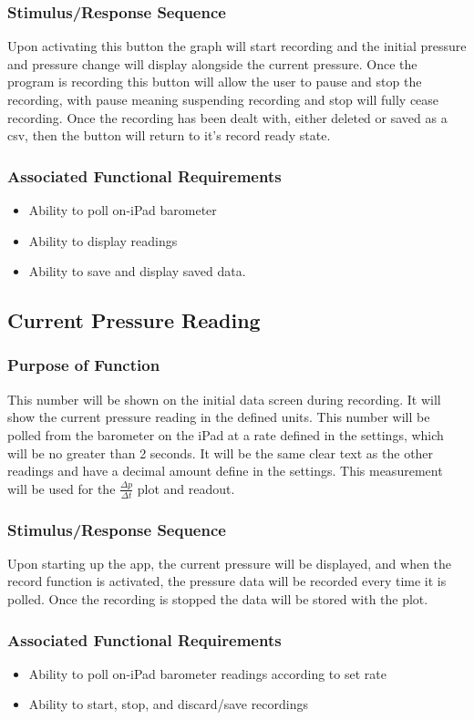 \documentclass[onecolumn, draftclsnofoot,10pt, compsoc]{IEEEtran}
\begin{document}
\subsubsection{Stimulus/Response Sequence}
Upon activating this button the graph will start recording and the initial pressure and pressure change will display alongside the current pressure.
Once the program is recording this button will allow the user to pause and stop the recording, with pause meaning suspending recording and stop will fully cease recording.
Once the recording has been dealt with, either deleted or saved as a csv, then the button will return to it's record ready state.
\subsubsection{Associated Functional Requirements}
\begin{itemize}
\item Ability to poll on-iPad barometer
\item Ability to display readings
\item Ability to save and display saved data.
\end{itemize}

\subsection{Current Pressure Reading}
\subsubsection{Purpose of Function}
This number will be shown on the initial data screen during recording.
It will show the current pressure reading in the defined units.
This number will be polled from the barometer on the iPad at a rate defined in the settings, which will be no greater than 2 seconds.
It will be the same clear text as the other readings and have a decimal amount define in the settings.
This measurement will be used for the $\frac{\Delta p}{\Delta t}$ plot and readout.
\subsubsection{Stimulus/Response Sequence}
Upon starting up the app, the current pressure will be displayed, and when the record function is activated, the pressure data will be recorded every time it is polled.
Once the recording is stopped the data will be stored with the plot.
\subsubsection{Associated Functional Requirements}
\begin{itemize}
\item Ability to poll on-iPad barometer readings according to set rate
\item Ability to start, stop, and discard/save recordings
\end{itemize}
\end{document}
